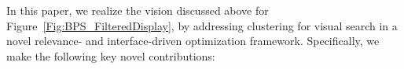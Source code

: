 
In this paper, we realize the vision discussed above for Figure~\ref{Fig:BPS_FilteredDisplay},
by addressing clustering for visual search in a novel relevance- and interface-driven optimization framework.
Specifically, we make the following key novel contributions:
